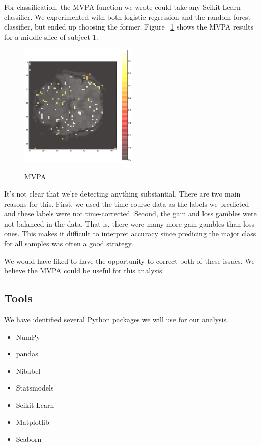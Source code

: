 \documentclass[11pt]{article}
\begin{document}
For classification, the MVPA function we wrote could take any Scikit-Learn
classifier. We experimented with both logistic regression and the random forest
classifier, but ended up choosing the former. Figure ~\ref{fig:mvpa} shows the
MVPA results for a middle slice of subject 1.

\begin{figure}[h]
\caption{MVPA}
\centering
\includegraphics[width=0.5\textwidth]{mvpa.png}
\label{fig:mvpa}
\end{figure}

It's not clear that we're detecting anything substantial. There are two main
reasons for this. First, we used the time course data as the labels we
predicted and these labels were not time-corrected. Second, the gain and loss
gambles were not balanced in the data. That is, there were many more gain
gambles than loss ones. This makes it difficult to interpret accuracy since
predicing the major class for all samples was often a good strategy.

We would have liked to have the opportunity to correct both of these issues. We
believe the MVPA could be useful for this analysis.

\subsection{Tools}

We have identified several Python packages we will use for our analysis.

\begin{itemize}
  \item{NumPy}
  \item{pandas}
  \item{Nibabel}
  \item{Statsmodels}
  \item{Scikit-Learn}
  \item{Matplotlib}
  \item{Seaborn}
\end{itemize}
\end{document}
